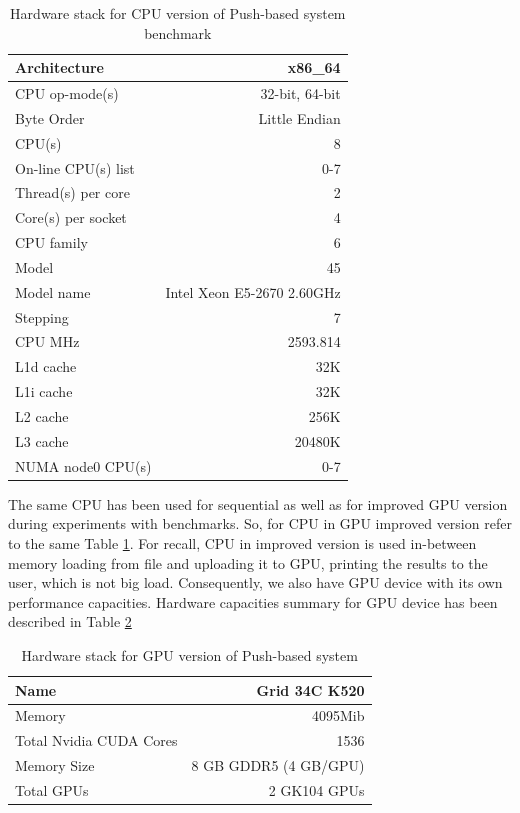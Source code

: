 \documentclass[12pt,letterpaper]{report}
\begin{document}
\begin{table}[h!]
	\renewcommand*{\arraystretch}{1.5}
	\tabcolsep=0.12cm
	\centering
  \begin{tabular}{| l | r |}
   \hline
Architecture & x86\_64 \\  \hline
CPU op-mode(s) & 32-bit, 64-bit \\   \hline
Byte Order & Little Endian \\   \hline
CPU(s) & 8 \\   \hline
On-line CPU(s) list & 0-7 \\   \hline
Thread(s) per core & 2 \\   \hline
Core(s) per socket & 4 \\   \hline
CPU family & 6 \\   \hline
Model & 45 \\   \hline
Model name & Intel Xeon E5-2670 2.60GHz \\   \hline
Stepping & 7 \\   \hline
CPU MHz & 2593.814 \\  \hline  
L1d cache & 32K \\   \hline
L1i cache & 32K \\   \hline
L2 cache & 256K \\   \hline
L3 cache & 20480K \\   \hline
NUMA node0 CPU(s) & 0-7 \\  \hline
  \end{tabular}
    \caption{Hardware stack for CPU version of Push-based system benchmark}
      \label{tb:cpuhardware}
\end{table}

\noindent\hspace{3em} The same CPU has been used for sequential as well as for improved GPU version during experiments with benchmarks. So, for CPU in GPU improved version refer to the same Table \ref{tb:cpuhardware}. For recall, CPU in improved version is used in-between memory loading from file and uploading it to GPU, printing the results to the user, which is not big load. 
\clearpage
Consequently, we also have GPU device with its own performance capacities. Hardware capacities summary for GPU device has been described in Table \ref{tb:gpuhardware}

\begin{table}[h!]
	\renewcommand*{\arraystretch}{1.5}
	\tabcolsep=0.12cm
  \centering
  \begin{tabular}{| l | r |}
   \hline
	Name & Grid 34C K520 \\ \hline
	Memory & 4095Mib \\ \hline
	Total Nvidia CUDA Cores & 1536 \\ \hline
	Memory Size & 8 GB GDDR5 (4 GB/GPU) \\ \hline
	Total GPUs & 2 GK104 GPUs \\ \hline
  \end{tabular}
    \caption{Hardware stack for GPU version of Push-based system}
    	  \label{tb:gpuhardware}
\end{table}
\end{document}
